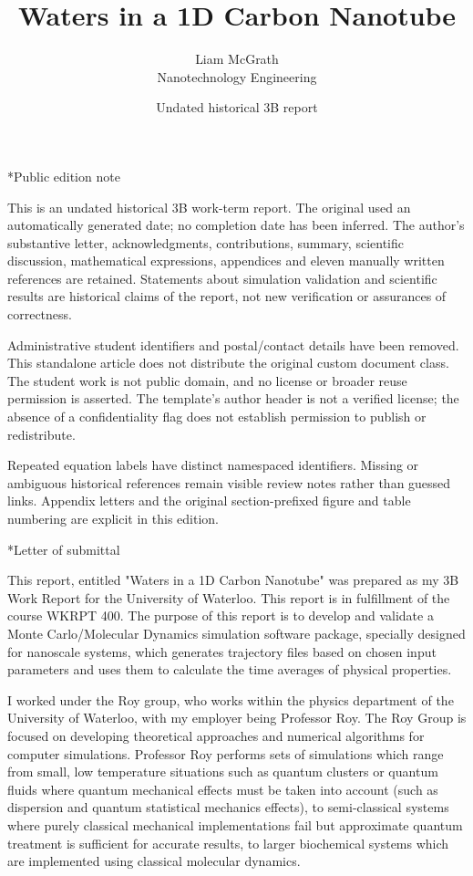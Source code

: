 \documentclass[11pt]{article}
\title{Waters in a 1D Carbon Nanotube}
\author{Liam McGrath\\Nanotechnology Engineering}
\date{Undated historical 3B report}
\makeatletter
\let\workreportsection\section
\renewcommand{\section}{\@ifstar{\workreportstarsection}{\workreportsection}}
\newcommand{\workreportstarsection}[1]{\workreportsection*{#1}\addcontentsline{toc}{section}{#1}}
\makeatother
\begin{document}
\maketitle

\section*{Public edition note}
\label{work-report-edition}

This is an undated historical 3B work-term report. The original used an automatically generated date; no completion date has been inferred. The author's substantive letter, acknowledgments, contributions, summary, scientific discussion, mathematical expressions, appendices and eleven manually written references are retained. Statements about simulation validation and scientific results are historical claims of the report, not new verification or assurances of correctness.

Administrative student identifiers and postal/contact details have been removed. This standalone article does not distribute the original custom document class. The student work is not public domain, and no license or broader reuse permission is asserted. The template's author header is not a verified license; the absence of a confidentiality flag does not establish permission to publish or redistribute.

Repeated equation labels have distinct namespaced identifiers. Missing or ambiguous historical references remain visible review notes rather than guessed links. Appendix letters and the original section-prefixed figure and table numbering are explicit in this edition.

\section*{Letter of submittal}
\label{wr-front-letter-1}

This report, entitled "Waters in a 1D Carbon Nanotube" was prepared as my 3B Work Report for the University of Waterloo. This report is in fulfillment of the course WKRPT 400. The purpose of this report is to develop and validate a Monte Carlo/Molecular Dynamics simulation software package, specially designed for nanoscale systems, which generates trajectory files based on chosen input parameters and uses them to calculate the time averages of physical properties. 

I worked under the Roy group, who works within the physics department of the University of Waterloo, with my employer being Professor Roy. The Roy Group is focused on developing theoretical approaches and numerical algorithms for computer simulations. Professor Roy performs sets of simulations which range from small, low temperature situations such as quantum clusters or quantum fluids where quantum mechanical effects must be taken into account (such as dispersion and quantum statistical mechanics effects), to semi-classical systems where purely classical mechanical implementations fail but approximate quantum treatment is sufficient for accurate results, to larger biochemical systems which are implemented using classical molecular dynamics. 
\end{document}
